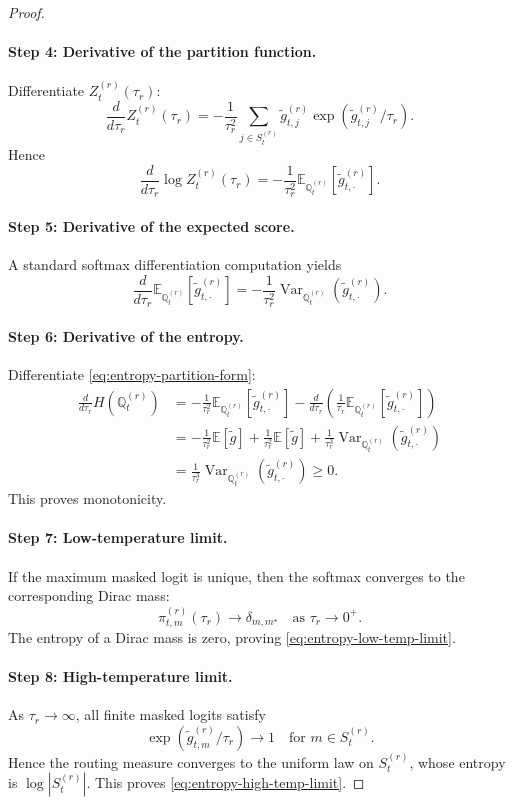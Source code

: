 \documentclass{article}
\theoremstyle{plain}
\theoremstyle{definition}
\theoremstyle{remark}
\begin{document}
\begin{proof}
\paragraph{Step 4: Derivative of the partition function.}
Differentiate $Z_{t}^{(r)}(\tau_r)$:
\[
\frac{d}{d\tau_r} Z_{t}^{(r)}(\tau_r)
=
-\frac{1}{\tau_r^2}
\sum_{j\in S_{t}^{(r)}} \tilde g^{(r)}_{t,j}
\exp(\tilde g^{(r)}_{t,j}/\tau_r).
\]
Hence
\[
\frac{d}{d\tau_r}\log Z_{t}^{(r)}(\tau_r)
=
-\frac{1}{\tau_r^2}
\mathbb{E}_{\mathbb{Q}^{(r)}_{t}}[\tilde g^{(r)}_{t,\cdot}].
\]

\paragraph{Step 5: Derivative of the expected score.}
A standard softmax differentiation computation yields
\[
\frac{d}{d\tau_r}
\mathbb{E}_{\mathbb{Q}^{(r)}_{t}}[\tilde g^{(r)}_{t,\cdot}]
=
-\frac{1}{\tau_r^2}
\operatorname{Var}_{\mathbb{Q}^{(r)}_{t}}(\tilde g^{(r)}_{t,\cdot}).
\]

\paragraph{Step 6: Derivative of the entropy.}
Differentiate \eqref{eq:entropy-partition-form}:
\begin{align}
\frac{d}{d\tau_r}
H\!\left(\mathbb{Q}^{(r)}_{t}\right)
&=
-\frac{1}{\tau_r^2}
\mathbb{E}_{\mathbb{Q}^{(r)}_{t}}[\tilde g^{(r)}_{t,\cdot}]
-
\frac{d}{d\tau_r}
\left(
\frac{1}{\tau_r}
\mathbb{E}_{\mathbb{Q}^{(r)}_{t}}[\tilde g^{(r)}_{t,\cdot}]
\right)
\\
&=
-\frac{1}{\tau_r^2}\mathbb{E}[\tilde g]
+
\frac{1}{\tau_r^2}\mathbb{E}[\tilde g]
+
\frac{1}{\tau_r^3}
\operatorname{Var}_{\mathbb{Q}^{(r)}_{t}}(\tilde g^{(r)}_{t,\cdot})
\\
&=
\frac{1}{\tau_r^3}
\operatorname{Var}_{\mathbb{Q}^{(r)}_{t}}(\tilde g^{(r)}_{t,\cdot})
\ge 0.
\end{align}
This proves monotonicity.

\paragraph{Step 7: Low-temperature limit.}
If the maximum masked logit is unique, then the softmax converges to the corresponding Dirac mass:
\[
\pi^{(r)}_{t,m}(\tau_r)\to \delta_{m,m^\star}
\quad\text{as } \tau_r\to 0^+.
\]
The entropy of a Dirac mass is zero, proving \eqref{eq:entropy-low-temp-limit}.

\paragraph{Step 8: High-temperature limit.}
As $\tau_r\to\infty$, all finite masked logits satisfy
\[
\exp(\tilde g^{(r)}_{t,m}/\tau_r)\to 1
\quad\text{for } m\in S_{t}^{(r)}.
\]
Hence the routing measure converges to the uniform law on $S_{t}^{(r)}$, whose entropy is $\log |S_{t}^{(r)}|$. This proves \eqref{eq:entropy-high-temp-limit}.
\end{proof}
\end{document}
